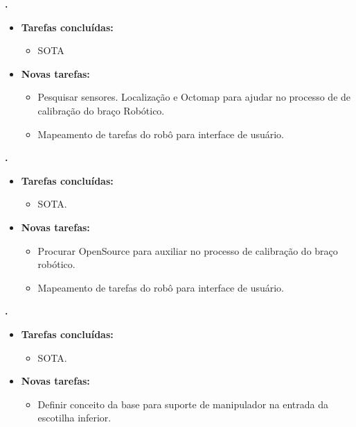\textbf{\elael.} 
	\begin{itemize}
		\item \textbf{Tarefas concluídas:}
			\begin{itemize}    
				\item SOTA
			\end{itemize}
		
		\item \textbf{Novas tarefas:}
			\begin{itemize} 
				\item Pesquisar sensores. Localização e Octomap para ajudar no processo de
				de calibração do braço Robótico.
				\item Mapeamento de tarefas do robô para interface de usuário.
			\end{itemize}
	\end{itemize}
					
			
   \textbf{\gabriel.} 
	\begin{itemize}
		\item \textbf{Tarefas concluídas:}
			\begin{itemize}    
				\item SOTA.
			\end{itemize}
		
		\item \textbf{Novas tarefas:}
			\begin{itemize} 
			    \item Procurar OpenSource para auxiliar no processo de calibração do
			    braço robótico.
				\item Mapeamento de tarefas do robô para interface de usuário.
			\end{itemize}
	\end{itemize}

			
		
   \textbf{.} 
	\begin{itemize}
		\item \textbf{Tarefas concluídas:}
			\begin{itemize}    
				\item SOTA.
			\end{itemize}
		
		\item \textbf{Novas tarefas:}
			\begin{itemize} 
			    \item Definir conceito da base para suporte de manipulador na entrada da
			    escotilha inferior.
			\end{itemize}
	\end{itemize}
	
